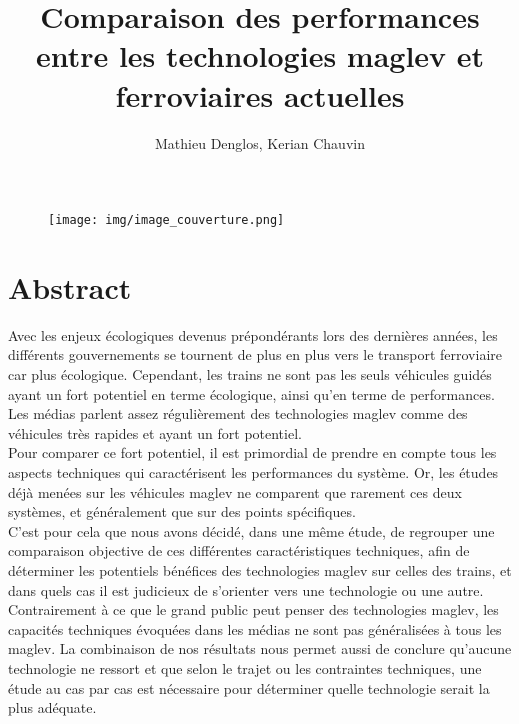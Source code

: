 \documentclass[12pt, a4paper, onecolumn]{article}
\title{Comparaison des performances entre les technologies maglev et ferroviaires actuelles}
\author{Mathieu Denglos, Kerian Chauvin}
\date{}
\renewcommand{\tab}{\tabto{15px}}
\begin{document}
\maketitle  %

\begin{figure}[H] %
  \centering
  \scalebox{0.28}
  {\texttt{[image: img/image\_couverture.png]}}
\end{figure}



\pagebreak %
\section*{Abstract} %
\tab Avec les enjeux écologiques devenus prépondérants lors des dernières années, les différents gouvernements se tournent de plus en plus vers le transport ferroviaire car plus écologique.
Cependant, les trains ne sont pas les seuls véhicules guidés ayant un fort potentiel en terme écologique, ainsi qu’en terme de performances.
Les médias parlent assez régulièrement des technologies maglev comme des véhicules très rapides et ayant un fort potentiel.\\
\tab Pour comparer ce fort potentiel, il est primordial de prendre en compte tous les aspects techniques qui caractérisent les performances du système.
Or, les études déjà menées sur les véhicules maglev ne comparent que rarement ces deux systèmes, et généralement que sur des points spécifiques. \\
\linebreak
\tab C’est pour cela que nous avons décidé, dans une même étude, de regrouper une comparaison objective de ces différentes caractéristiques techniques, afin de déterminer les potentiels bénéfices des technologies maglev sur celles des trains, et dans quels cas il est judicieux de s’orienter vers une technologie ou une autre. \\
\linebreak
\tab Contrairement à ce que le grand public peut penser des technologies maglev, les capacités techniques évoquées dans les médias ne sont pas généralisées à tous les maglev.
La combinaison de nos résultats nous permet aussi de conclure qu’aucune technologie ne ressort et que selon le trajet ou les contraintes techniques, une étude au cas par cas est nécessaire pour déterminer quelle technologie serait la plus adéquate. \\
\end{document}
